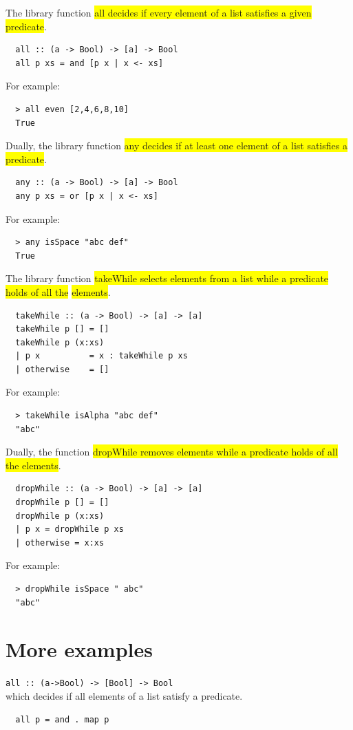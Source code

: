 \documentclass[tikz,border=10pt]{project_plan}
\begin{document}
The library function \colorbox{yellow}{all decides if every element of a list
  satisfies a given predicate}.
\begin{lstlisting}
  all :: (a -> Bool) -> [a] -> Bool
  all p xs = and [p x | x <- xs]
\end{lstlisting}
For example:
\begin{lstlisting}
  > all even [2,4,6,8,10]
  True
\end{lstlisting}

Dually, the library function \colorbox{yellow}{any decides if at least
  one element of a list satisfies a predicate}.
\begin{lstlisting}
  any :: (a -> Bool) -> [a] -> Bool
  any p xs = or [p x | x <- xs]
\end{lstlisting}
For example:
\begin{lstlisting}
  > any isSpace "abc def"
  True
\end{lstlisting}

The library function \colorbox{yellow}{takeWhile selects elements from a list
  while a predicate holds of all the} \colorbox{yellow}{elements}.
\begin{lstlisting}
  takeWhile :: (a -> Bool) -> [a] -> [a]
  takeWhile p [] = []
  takeWhile p (x:xs)
  | p x          = x : takeWhile p xs
  | otherwise    = []
\end{lstlisting}
For example:
\begin{lstlisting}
  > takeWhile isAlpha "abc def"
  "abc"
\end{lstlisting}

Dually, the function \colorbox{yellow}{dropWhile removes elements while a
  predicate holds of all the elements}.
\begin{lstlisting}
  dropWhile :: (a -> Bool) -> [a] -> [a]
  dropWhile p [] = []
  dropWhile p (x:xs)
  | p x = dropWhile p xs
  | otherwise = x:xs
\end{lstlisting}
For example:
\begin{lstlisting}
  > dropWhile isSpace " abc"
  "abc"
\end{lstlisting}


\section{More examples}

\lstinline?all :: (a->Bool) -> [Bool] -> Bool?\\
which decides if all elements of a list satisfy a predicate.
\begin{lstlisting}
  all p = and . map p
\end{lstlisting}
\end{document}

